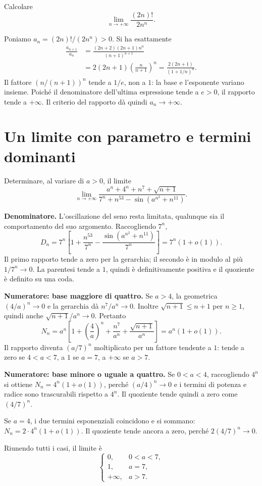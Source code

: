 \begin{esercizio}
Calcolare
\[
\lim_{n\to+\infty}\frac{(2n)!}{2n^n}.
\]
\end{esercizio}
\begin{svolgimento}
Poniamo $a_n=(2n)!/(2n^n)>0$. Si ha esattamente
\[
\begin{aligned}
\frac{a_{n+1}}{a_n}
&=\frac{(2n+2)(2n+1)n^n}{(n+1)^{n+1}}\\
&=2(2n+1)\left(\frac n{n+1}\right)^n
=\frac{2(2n+1)}{(1+1/n)^n}.
\end{aligned}
\]
Il fattore $(n/(n+1))^n$ tende a $1/e$, non a $1$: la base e l'esponente variano insieme. Poiché il denominatore dell'ultima espressione tende a $e>0$, il rapporto tende a $+\infty$. Il criterio del rapporto dà quindi $a_n\to+\infty$.
\end{svolgimento}

\section{Un limite con parametro e termini dominanti}

\begin{esercizio}
Determinare, al variare di $a>0$, il limite
\[
\lim_{n\to+\infty}
\frac{a^n+4^n+n^7+\sqrt{n+1}}
{7^n+n^{53}-\sin(a^{n^2}+n^{11})}.
\]
\end{esercizio}
\begin{svolgimento}
\textbf{Denominatore.} L'oscillazione del seno resta limitata, qualunque sia il comportamento del suo argomento. Raccogliendo $7^n$,
\[
D_n=7^n\left[1+\frac{n^{53}}{7^n}
-\frac{\sin(a^{n^2}+n^{11})}{7^n}\right]
=7^n(1+o(1)).
\]
Il primo rapporto tende a zero per la gerarchia; il secondo è in modulo al più $1/7^n\to0$. La parentesi tende a $1$, quindi è definitivamente positiva e il quoziente è definito su una coda.

\textbf{Numeratore: base maggiore di quattro.} Se $a>4$, la geometrica $(4/a)^n\to0$ e la gerarchia dà $n^7/a^n\to0$. Inoltre $\sqrt{n+1}\le n+1$ per $n\ge1$, quindi anche $\sqrt{n+1}/a^n\to0$. Pertanto
\[
N_n=a^n\left[1+\left(\frac4a\right)^n
+\frac{n^7}{a^n}+\frac{\sqrt{n+1}}{a^n}\right]
=a^n(1+o(1)).
\]
Il rapporto diventa $(a/7)^n$ moltiplicato per un fattore tendente a $1$: tende a zero se $4<a<7$, a $1$ se $a=7$, a $+\infty$ se $a>7$.

\textbf{Numeratore: base minore o uguale a quattro.} Se $0<a<4$, raccogliendo $4^n$ si ottiene $N_n=4^n(1+o(1))$, perché $(a/4)^n\to0$ e i termini di potenza e radice sono trascurabili rispetto a $4^n$. Il quoziente tende quindi a zero come $(4/7)^n$.

Se $a=4$, i due termini esponenziali coincidono e si sommano: $N_n=2\cdot4^n(1+o(1))$. Il quoziente tende ancora a zero, perché $2(4/7)^n\to0$.

Riunendo tutti i casi, il limite è
\[
\boxed{\begin{cases}
0,&0<a<7,\\
1,&a=7,\\
+\infty,&a>7.
\end{cases}}
\]
\end{svolgimento}
